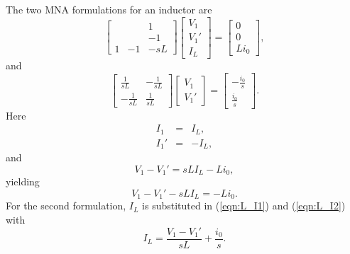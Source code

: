 \documentclass[a4paper, 12pt]{article}
\newcommand{\refeqn}[1]{\mbox{(\ref{eqn:#1})}}
\begin{document}
The two MNA formulations for an inductor are
%
\begin{equation}
  \begin{bmatrix}
     &  & 1 \\
     &  & -1 \\
1 & -1 & -sL
  \end{bmatrix}
  \begin{bmatrix}
    V_1 \\ V_1' \\ I_L
  \end{bmatrix}
=
\begin{bmatrix}
  0 \\ 0 \\ L i_0
\end{bmatrix},
\end{equation}
%
and
%
\begin{equation}
  \begin{bmatrix}
    \frac{1}{sL} & -\frac{1}{sL} \\
   -\frac{1}{sL} & \frac{1}{sL}
  \end{bmatrix}
  \begin{bmatrix}
    V_1 \\ V_1'
  \end{bmatrix}
=
\begin{bmatrix}
  -\frac{i_0}{s} \\ \frac{i_0}{s}
\end{bmatrix}.
\end{equation}
%
Here
%
\begin{eqnarray}
\label{eqn:L_I1}
  I_1 & = & I_L, \\
  I_1' & = & -I_L,
\label{eqn:L_I2}
\end{eqnarray}
%
and
%
\begin{equation}
 V_1 - V_1' = s L I_L - L i_0, 
\end{equation}
%
yielding
%
\begin{equation}
  V_1 - V_1' - s L I_L = -L i_0.
\end{equation}
%
For the second formulation, $I_L$ is substituted in \refeqn{L_I1} and
\refeqn{L_I2} with
%
\begin{equation}
  I_L = \frac{V_1 - V_1'}{sL} + \frac{i_0}{s}.
\end{equation}
\end{document}
